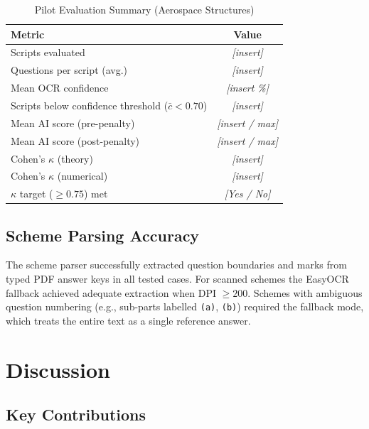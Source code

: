 \documentclass[conference]{IEEEtran}
\begin{document}
\begin{table}[H]
\centering
\caption{Pilot Evaluation Summary (Aerospace Structures)}
\label{tab:results}
\begin{tabular}{lc}
\toprule
\textbf{Metric} & \textbf{Value} \\
\midrule
Scripts evaluated              & \emph{[insert]} \\
Questions per script (avg.)    & \emph{[insert]} \\
Mean OCR confidence            & \emph{[insert \%]} \\
Scripts below confidence threshold ($\bar{c} < 0.70$) & \emph{[insert]} \\
Mean AI score (pre-penalty)    & \emph{[insert / max]} \\
Mean AI score (post-penalty)   & \emph{[insert / max]} \\
Cohen's $\kappa$ (theory)      & \emph{[insert]} \\
Cohen's $\kappa$ (numerical)   & \emph{[insert]} \\
$\kappa$ target ($\geq 0.75$) met & \emph{[Yes / No]} \\
\bottomrule
\end{tabular}
\end{table}

\subsection{Scheme Parsing Accuracy}

The scheme parser successfully extracted question boundaries and marks from typed PDF answer keys in all tested cases. For scanned schemes the EasyOCR fallback achieved adequate extraction when DPI $\geq 200$. Schemes with ambiguous question numbering (e.g., sub-parts labelled \texttt{(a)}, \texttt{(b)}) required the fallback mode, which treats the entire text as a single reference answer.

\section{Discussion}
\label{sec:discussion}

\subsection{Key Contributions}
\end{document}
